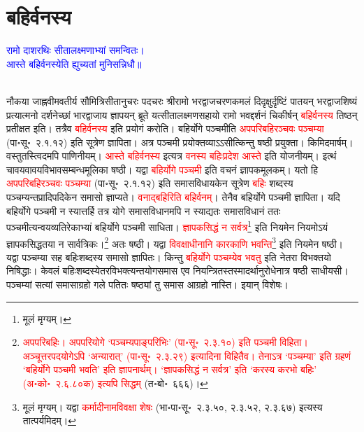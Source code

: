 \section[बहिर्वनस्य]{बहिर्वनस्य}
\label{sec:bahirvanasya}
\centering\textcolor{blue}{रामो दाशरथिः सीतालक्ष्मणाभ्यां समन्वितः।\nopagebreak\\
आस्ते बहिर्वनस्येति ह्युच्यतां मुनिसन्निधौ॥}\nopagebreak\\
\\
\begin{sloppypar}\justifying\noindent\hspace{10mm} नौकया जाह्नवीमवतीर्य सौमित्रि\-सीतानुचरः पद\-चरः श्रीरामो भरद्वाज\-चरण\-कमलं दिदृक्षुर्दृष्टिं पातयन् भरद्वाज\-शिष्यं प्रत्यात्मनो दर्शनेच्छां भारद्वाजाय ज्ञापयन् ब्रूते यत्सीता\-लक्ष्मण\-सहायो रामो भवद्दर्शनं चिकीर्षन् \textcolor{red}{बहिर्वनस्य} तिष्ठन् प्रतीक्षत इति। तत्रैव \textcolor{red}{बहिर्वनस्य} इति प्रयोगं करोति। बहिर्योगे पञ्चमीति \textcolor{red}{अपपरिबहिरञ्चवः पञ्चम्या} (पा॰सू॰~२.१.१२) इति सूत्रेण ज्ञापिता। अत्र पञ्चमी प्रयोक्तव्याऽऽसीत्किन्तु षष्ठी प्रयुक्ता। किमिदमार्षम्। वस्तुतस्त्विदमपि पाणिनीयम्। \textcolor{red}{आस्ते बहिर्वनस्य} इत्यत्र \textcolor{red}{वनस्य बहिःप्रदेश आस्ते} इति योजनीयम्। इत्थं चावयवावयवि\-भाव\-सम्बन्धमूलिका षष्ठी। यद्वा \textcolor{red}{बहिर्योगे पञ्चमी} इति वचनं ज्ञापक\-मूलकम्। यतो हि \textcolor{red}{अपपरिबहिरञ्चवः पञ्चम्या} (पा॰सू॰~२.१.१२) इति समास\-विधायकेन सूत्रेण \textcolor{red}{बहिः} शब्दस्य पञ्चम्यन्त\-प्रादिपदिकेन समासो ज्ञाप्यते। \textcolor{red}{वनाद्बहिरिति बहिर्वनम्‌}। तेनैव बहिर्योगे पञ्चमी ज्ञापिता। यदि बहिर्योगे पञ्चमी न स्यात्तर्हि तत्र योगे समास\-विधानमपि न स्याद्यतः समास\-विधानं ततः पञ्चमीत्यन्वय\-व्यतिरेकाभ्यां बहिर्योगे पञ्चमी साधिता। \textcolor{red}{ज्ञापक\-सिद्धं न सर्वत्र}\footnote{मूलं मृग्यम्।} इति नियमेन नियमोऽयं ज्ञापक\-सिद्धतया न सार्वत्रिकः।\footnote{\textcolor{red}{अपपरिबहिः। अपपरियोगे ‘पञ्चम्यपाङ्परिभिः’ (पा॰सू॰~२.३.१०) इति पञ्चमी विहिता। अञ्चूत्तरपदयोगेऽपि ‘अन्यारात्’ (पा॰सू॰~२.३.२९) इत्यादिना विहितैव। तेनाऽत्र ‘पञ्चम्या’ इति ग्रहणं ‘बहिर्योगे पञ्चमी भवति’ इति ज्ञापनार्थम्। ‘ज्ञापकसिद्धं न सर्वत्र’ इति ‘करस्य करभो बहिः’ (अ॰को॰~२.६.८०क) इत्यपि सिद्धम्‌} (त॰बो॰~६६६)।} अतः षष्ठी। यद्वा \textcolor{red}{विवक्षाधीनानि कारकाणि भवन्ति}\footnote{मूलं मृग्यम्। यद्वा \textcolor{red}{कर्मादीनामविवक्षा शेषः} (भा॰पा॰सू॰~२.३.५०, २.३.५२, २.३.६७) इत्यस्य तात्पर्यमिदम्।} इति नियमेन षष्ठी। यद्वा पञ्चम्या सह बहिःशब्दस्य समासो ज्ञापितः। किन्तु \textcolor{red}{बहिर्योगे पञ्चम्येव भवतु} इति नेतरा विभक्तयो निषिद्धाः। केवलं बहिः\-शब्दस्येतर\-विभक्त्यन्त\-योग\-समास एव नियन्त्रितस्तस्मादर्थानुरोधेनात्र षष्ठी साधीयसी। पञ्चम्यां सत्यां समासाग्रहो गले पतितः षष्ठ्यां तु समास आग्रहो नास्ति। इयान् विशेषः।\end{sloppypar}
